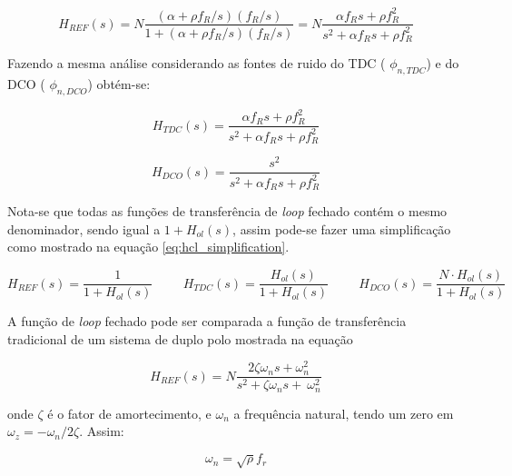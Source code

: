 	\begin{equation}
	H_{REF}(s) = N\frac{ ( \alpha + \rho f_R/s)(f_R/s)}{1 + (\alpha + \rho f_R/s) (f_R/s)} =  N\frac{ \alpha f_R s + \rho f_R^2}{s^2 + \alpha f_R s + \rho f_R^2}
	\label{eq:hcl_s_adpll_tipe_II}
	\end{equation}

Fazendo a mesma análise considerando as fontes de ruido do TDC ( $\phi_{n,TDC}$) e do DCO ( $\phi_{n,DCO}$) obtém-se:

	\begin{equation}
	H_{TDC}(s) =\frac{ \alpha f_R s + \rho f_R^2}{s^2 + \alpha f_R s + \rho f_R^2}
	\label{eq:tdc_s_adpll_tipe_II}
	\end{equation}
	
	\begin{equation}
	H_{DCO}(s) = \frac{s^2}{s^2 + \alpha f_R s + \rho f_R^2}
	\label{eq:dco_s_adpll_tipe_II}
	\end{equation}

Nota-se que todas as funções de transferência de \textit{loop} fechado contém o mesmo denominador, sendo igual a $ 1 + H_{ol}(s)$, assim pode-se fazer uma simplificação como mostrado na equação \ref{eq:hcl_simplification}.


	\begin{equation}
	H_{REF}(s) =  \frac{1}{1 + H_{ol}(s)} \hspace{1cm}
	H_{TDC}(s) =  \frac{ H_{ol}(s)}{1 + H_{ol}(s)} \hspace{1cm}
	H_{DCO}(s) =  \frac{N \cdot H_{ol}(s)}{1 + H_{ol}(s)} \hspace{1cm}
	\label{eq:hcl_simplification}
\end{equation}

A função de \textit{loop} fechado pode ser comparada a função de transferência tradicional de um sistema de duplo polo mostrada na equação  

	\begin{equation}
	H_{REF}(s) =   N\frac{ 2 \zeta \omega_n s +  \omega_n^2}{s^2 + \zeta  \omega_n s + \ \omega_n^2}
	\label{eq:classical_two_pole}
	\end{equation}

onde $\zeta$ é o fator de amortecimento, e $\omega_n$ a frequência natural, tendo um zero em $\omega_z = - \omega_n / 2 \zeta$. Assim:


	\begin{equation}
	\omega_n = \sqrt{\rho} f_r
	\label{eq:omena_n}
	\end{equation}	
	
